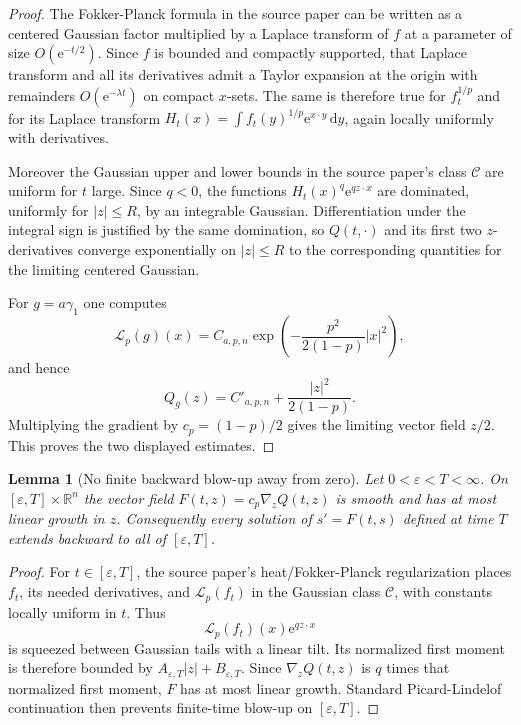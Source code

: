 \documentclass[11pt]{article}
\newtheorem{lemma}{Lemma}
\newcommand{\R}{\mathbb R}
\newcommand{\lap}{\mathcal L_p}
\newcommand{\e}{\mathrm e}
\newcommand{\dd}{\,\mathrm d}
\newcommand{\grad}{\nabla}
\begin{document}
\begin{proof}
The Fokker-Planck formula in the source paper can be written as a centered
Gaussian factor multiplied by a Laplace transform of $f$ at a parameter of
size $O(\e^{-t/2})$. Since $f$ is bounded and compactly supported, that
Laplace transform and all its derivatives admit a Taylor expansion at the
origin with remainders $O(\e^{-\lambda t})$ on compact $x$-sets. The same is
therefore true for $f_t^{1/p}$ and for its Laplace transform
$H_t(x)=\int f_t(y)^{1/p}\e^{x\cdot y}\dd y$, again locally uniformly with
derivatives.

Moreover the Gaussian upper and lower bounds in the source paper's class
$\mathcal C$ are uniform for $t$ large. Since $q<0$, the functions
$H_t(x)^q\e^{qz\cdot x}$ are dominated, uniformly for $|z|\le R$, by an
integrable Gaussian. Differentiation under the integral sign is justified by
the same domination, so $Q(t,\cdot)$ and its first two $z$-derivatives converge
exponentially on $|z|\le R$ to the corresponding quantities for the limiting
centered Gaussian.

For $g=a\gamma_1$ one computes
\[
  \lap(g)(x)=C_{a,p,n}\exp\left(-\frac{p^2}{2(1-p)}|x|^2\right),
\]
and hence
\[
  Q_g(z)=C'_{a,p,n}+\frac{|z|^2}{2(1-p)}.
\]
Multiplying the gradient by $c_p=(1-p)/2$ gives the limiting vector field
$z/2$. This proves the two displayed estimates.
\end{proof}

\begin{lemma}[No finite backward blow-up away from zero]
\label{lem:continuation}
Let $0<\varepsilon<T<\infty$. On $[\varepsilon,T]\times\R^n$ the vector field
$F(t,z)=c_p\grad_zQ(t,z)$ is smooth and has at most linear growth in $z$.
Consequently every solution of $s'=F(t,s)$ defined at time $T$ extends
backward to all of $[\varepsilon,T]$.
\end{lemma}

\begin{proof}
For $t\in[\varepsilon,T]$, the source paper's heat/Fokker-Planck regularization
places $f_t$, its needed derivatives, and $\lap(f_t)$ in the Gaussian class
$\mathcal C$, with constants locally uniform in $t$. Thus
\[
  \lap(f_t)(x)\e^{qz\cdot x}
\]
is squeezed between Gaussian tails with a linear tilt. Its normalized first
moment is therefore bounded by $A_{\varepsilon,T}|z|+B_{\varepsilon,T}$. Since
$\grad_zQ(t,z)$ is $q$ times that normalized first moment, $F$ has at most
linear growth. Standard Picard-Lindelof continuation then prevents finite-time
blow-up on $[\varepsilon,T]$.
\end{proof}
\end{document}
